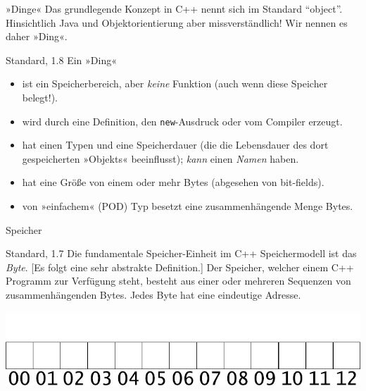 \begin{frame}[fragile]{»Dinge«}
	Das grundlegende Konzept in C++ nennt sich im Standard \enquote{object}. Hinsichtlich Java und Objektorientierung aber missverständlich!
	Wir nennen es daher »Ding«.
	
	\pause
	
	\small
	\begin{block}{Standard, 1.8}
		Ein »Ding«
		\begin{itemize}
			\item ist ein Speicherbereich, aber \emph{keine} Funktion (auch wenn diese Speicher belegt!).
			\item wird durch eine Definition, den \verb|new|-Ausdruck oder vom Compiler erzeugt.
			\item hat einen Typen und eine Speicherdauer {\tiny (die die Lebensdauer des dort gespeicherten »Objekts« beeinflusst)}; \emph{kann} einen \emph{Namen} haben.
			\item hat eine Größe von einem oder mehr Bytes {\tiny (abgesehen von bit-fields)}.
			\item von »einfachem« {\tiny (POD)} Typ besetzt eine zusammenhängende Menge Bytes.
		\end{itemize}
	\end{block}
\end{frame}

\begin{frame}[fragile]{Speicher}
	\begin{block}{Standard, 1.7}
		Die fundamentale Speicher-Einheit im C++ Speichermodell ist das \emph{Byte}. [Es folgt eine sehr abstrakte Definition.]
		Der Speicher, welcher einem C++ Programm zur Verfügung steht, besteht aus einer oder mehreren Sequenzen von zusammenhängenden Bytes.
		Jedes Byte hat eine eindeutige Adresse.
	\end{block}
	
	\pause
	
	\includegraphics[width=\linewidth]{images/free}
\end{frame}

